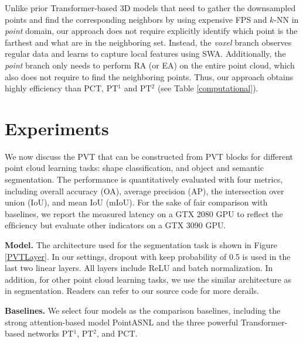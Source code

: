 \documentclass[10pt,twocolumn,letterpaper]{article}
\begin{document}
Unlike prior Transformer-based 3D models that need to gather the downsampled points and find the corresponding neighbors by using expensive FPS and $k$-NN in \emph{point} domain, our approach does not require explicitly identify which point is the farthest and what are in the neighboring set. Instead, the \emph{voxel} branch observes regular data and learns to capture local features using SWA. Additionally, the \emph{point} branch only needs to perform RA (or EA) on the entire point cloud, which also does not require to find the neighboring points. Thus, our approach obtains highly efficiency than PCT, PT$^1$ and PT$^2$ (see Table \ref{computational}).


\section{Experiments}
We now discuss the PVT that can be constructed from PVT blocks for different point cloud learning tasks: shape classification, and object and semantic segmentation. The performance is quantitatively evaluated with four metrics, including overall accuracy (OA), average precision (AP), the intersection over union (IoU), and mean IoU (mIoU). For the sake of fair comparison with baselines, we report the measured latency on a GTX 2080 GPU to reﬂect the efﬁciency but evaluate other indicators on a GTX 3090 GPU.

\textbf{Model.}
The architecture used for the segmentation task is shown in Figure \ref{PVTLayer}. In our settings, dropout with keep probability of 0.5 is used in the last two linear layers. All layers include ReLU and batch normalization. In addition, for other point cloud learning tasks, we use the similar architecture as in segmentation. Readers can refer to our source code for more derails.

\textbf{Baselines.}
We select four models as the comparison baselines, including the strong attention-based model PointASNL and the three powerful Transformer-based networks PT$^1$, PT$^2$, and PCT.
\end{document}
